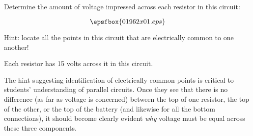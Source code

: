 

Determine the amount of voltage impressed across each resistor in this circuit:

$$\epsfbox{01962x01.eps}$$

Hint: locate all the points in this circuit that are electrically common to one another!







Each resistor has 15 volts across it in this circuit.







The hint suggesting identification of electrically common points is critical to students' understanding of parallel circuits.  Once they see that there is no difference (as far as voltage is concerned) between the top of one resistor, the top of the other, or the top of the battery (and likewise for all the bottom connections), it should become clearly evident {\it why} voltage must be equal across these three components.




